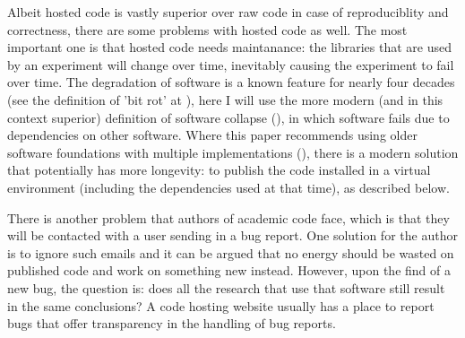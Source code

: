 Albeit hosted code is vastly superior over raw code
in case of reproduciblity and correctness,
there are some problems with hosted code as well.
The most important one is that hosted code needs maintanance:
the libraries that are used by an experiment
will change over time, inevitably causing the experiment to fail
over time. 
The degradation of software is a known feature for nearly 
four decades (see the definition of 'bit rot' at \cite{steele1983hacker}),
here I will use the more modern (and in this context superior)
definition of software collapse (\cite{hinsen2019dealing}),
in which software fails due to dependencies on other 
software.
Where this paper recommends using older software foundations 
with multiple implementations (\cite{hinsen2019dealing}),
there is a modern solution that potentially has more longevity:
to publish the code installed in a virtual environment
(including the dependencies used at that time), as described below.

There is another problem that authors of academic code face,
which is that they will be contacted with a user sending in a bug report.
One solution for the author is to ignore such emails
and it can be argued that no energy should be wasted on published code
and work on something new instead.
However, upon the find of a new bug, the question is:
does all the research that use that software still 
result in the same conclusions?
A code hosting website usually has a place to report bugs
that offer transparency in the handling of bug reports.

